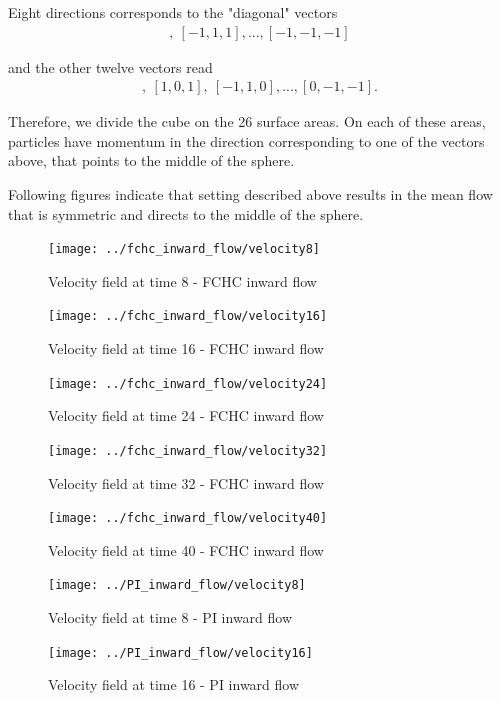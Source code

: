 Eight directions corresponds to the "diagonal" vectors
\begin{align}
[1,1,1],~[-1,1,1],...,[-1,-1,-1]
\end{align}

and the other twelve vectors read
\begin{align}
[1,1,0],~[1,0,1],~[-1,1,0],...,[0,-1,-1].
\end{align}

Therefore, we divide the cube on the 26 surface areas. On each of these areas, particles have momentum in the direction corresponding to one of the vectors above, that points to the middle of the sphere.

Following figures indicate that setting described above results in the mean flow that is symmetric and directs to the middle of the sphere.

\begin{figure}[htbp] 
 \centering 
 \texttt{[image: ../fchc\_inward\_flow/velocity8]}
 \label{cubosphere}
 \caption{Velocity field at time 8 - FCHC inward flow}
\end{figure}

\begin{figure}[htbp] 
 \centering 
 \texttt{[image: ../fchc\_inward\_flow/velocity16]}
 \caption{Velocity field at time 16 - FCHC inward flow}
\end{figure}


\begin{figure}[htbp] 
 \centering 
 \texttt{[image: ../fchc\_inward\_flow/velocity24]}
 \caption{Velocity field at time 24 - FCHC inward flow}
\end{figure}


\begin{figure}[htbp] 
 \centering 
 \texttt{[image: ../fchc\_inward\_flow/velocity32]}
 \caption{Velocity field at time 32 - FCHC inward flow}
\end{figure}


\begin{figure}[htbp] 
 \centering 
 \texttt{[image: ../fchc\_inward\_flow/velocity40]}
 \caption{Velocity field at time 40 - FCHC inward flow}
\end{figure}


\begin{figure}[htbp] 
 \centering 
 \texttt{[image: ../PI\_inward\_flow/velocity8]}
 \label{cubosphere}
 \caption{Velocity field at time 8 - PI inward flow}
\end{figure}

\begin{figure}[htbp] 
 \centering 
 \texttt{[image: ../PI\_inward\_flow/velocity16]}
 \caption{Velocity field at time 16 - PI inward flow}
\end{figure}


